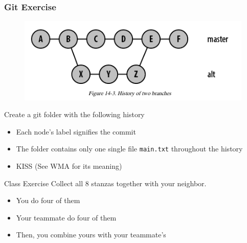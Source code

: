 \documentclass[hyperref={colorlinks=false},handout,10pt]{beamer}
\let\olditem\item
\renewcommand{\item}{\setlength{\itemsep}{0.5\baselineskip}\olditem}
\begin{document}
\begin{frame}[allowframebreaks]
    \frametitle{Git Exercise}
    \begin{figure}
        \begin{center}
            \includegraphics[width=\textwidth]{images/gitmergehistory.png}
        \end{center}
    \end{figure}
    \begin{block}{Create a git folder with the following history}
         \begin{itemize}
             \item Each node's label signifies the commit 
             \item The folder contains only one single file \texttt{main.txt}
                 throughout the history
             \item KISS (See WMA for its meaning)
         \end{itemize}
    \end{block}
    \begin{block}{Class Exercise}
        Collect all 8 stanzas together with your neighbor.
        \begin{itemize}
            \item You do four of them 
            \item Your teammate do four of them
            \item Then, you combine yours with your teammate's
        \end{itemize}
    \end{block}
    
\end{frame}
\end{document}
